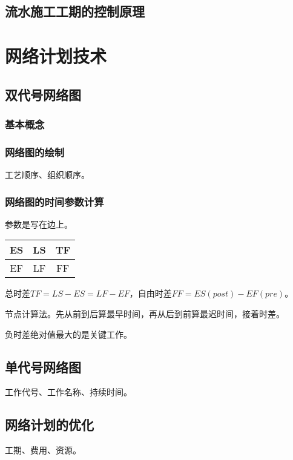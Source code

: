 \documentclass{book}
\begin{document}
\section{流水施工工期的控制原理}
\chapter{网络计划技术}
\section{双代号网络图}
\subsection{基本概念}
\subsection{网络图的绘制}
\par 工艺顺序、组织顺序。
\subsection{网络图的时间参数计算}
\par 参数是写在边上。
\begin{table}[htbp]
    \centering
    \begin{tabular}{c|c|c}
        ES & LS & TF \\
        \hline
        EF & LF & FF
    \end{tabular}
\end{table}
\par 总时差$TF=LS-ES=LF-EF$，自由时差$FF=ES(post)-EF(pre)$。
\par 节点计算法。先从前到后算最早时间，再从后到前算最迟时间，接着时差。
\par 负时差绝对值最大的是关键工作。
\section{单代号网络图}
\par 工作代号、工作名称、持续时间。
\section{网络计划的优化}
\par 工期、费用、资源。
\appendix

\end{document}
